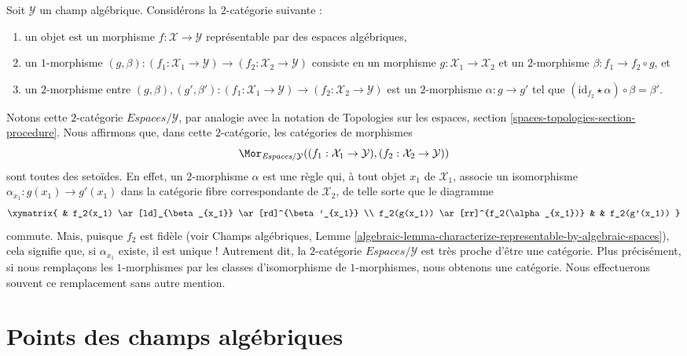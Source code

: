 \begin{remark}
\label{remark-representable-over}
Soit $\mathcal{Y}$ un champ algébrique. Considérons la
$2$-catégorie suivante :
\begin{enumerate}
\item un objet est un morphisme $f : \mathcal{X} \to \mathcal{Y}$
représentable par des espaces algébriques,
\item un $1$-morphisme
$(g, \beta) :
(f_1 : \mathcal{X}_1 \to \mathcal{Y})
\to
(f_2 : \mathcal{X}_2 \to \mathcal{Y})$
consiste en un morphisme $g : \mathcal{X}_1 \to \mathcal{X}_2$ et un
$2$-morphisme $\beta : f_1 \to f_2 \circ g$, et
\item un $2$-morphisme entre
$(g, \beta), (g', \beta') :
(f_1 : \mathcal{X}_1 \to \mathcal{Y})
\to
(f_2 : \mathcal{X}_2 \to \mathcal{Y})$
est un $2$-morphisme $\alpha : g \to g'$ tel que
$(\text{id}_{f_2} \star \alpha) \circ \beta = \beta'$.
\end{enumerate}
Notons cette $2$-catégorie $\textit{Espaces}/\mathcal{Y}$, par
analogie avec la notation de
Topologies sur les espaces, section \ref{spaces-topologies-section-procedure}.
Nous affirmons que, dans cette $2$-catégorie, les catégories de morphismes
$$
\Mor_{\textit{Espaces}/\mathcal{Y}}(
(f_1 : \mathcal{X}_1 \to \mathcal{Y}),
(f_2 : \mathcal{X}_2 \to \mathcal{Y}))
$$
sont toutes des setoïdes. En effet, un $2$-morphisme $\alpha$ est une règle qui, à tout
objet $x_1$ de $\mathcal{X}_1$, associe un isomorphisme
$\alpha_{x_1} : g(x_1) \longrightarrow g'(x_1)$
dans la catégorie fibre correspondante de $\mathcal{X}_2$, de telle sorte que le diagramme
$$
\xymatrix{
& f_2(x_1) \ar[ld]_{\beta_{x_1}} \ar[rd]^{\beta'_{x_1}} \\
f_2(g(x_1)) \ar[rr]^{f_2(\alpha_{x_1})} & &
f_2(g'(x_1))
}
$$
commute. Mais, puisque $f_2$ est fidèle (voir
Champs algébriques,
Lemme \ref{algebraic-lemma-characterize-representable-by-algebraic-spaces}),
cela signifie que, si $\alpha_{x_1}$ existe, il est unique ! Autrement dit, la
$2$-catégorie $\textit{Espaces}/\mathcal{Y}$ est très proche d'être
une catégorie. Plus précisément, si nous remplaçons les $1$-morphismes par les classes
d'isomorphisme de $1$-morphismes, nous obtenons une catégorie. Nous effectuerons souvent
ce remplacement sans autre mention.
\end{remark}




\section{Points des champs algébriques}
\label{section-points}


